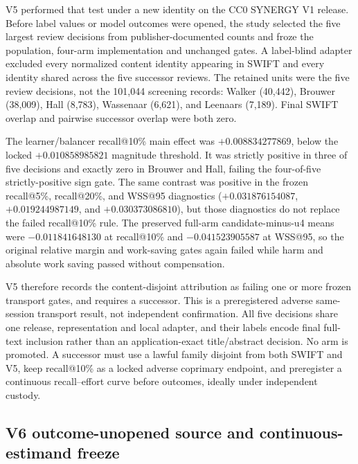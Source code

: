 V5 performed that test under a new identity on the CC0 SYNERGY V1 release.
Before label values or model outcomes were opened, the study selected the five
largest review decisions from publisher-documented counts and froze the
population, four-arm implementation and unchanged gates.  A label-blind
adapter excluded every normalized content identity appearing in SWIFT and
every identity shared across the five successor reviews.  The retained units
were the five review decisions, not the 101,044 screening records: Walker
(40,442), Brouwer (38,009), Hall (8,783), Wassenaar (6,621), and Leenaars
(7,189).  Final SWIFT overlap and pairwise successor overlap were both zero.

The learner/balancer recall@10\% main effect was $+0.008834277869$, below the
locked $+0.010858985821$ magnitude threshold.  It was strictly positive in
three of five decisions and exactly zero in Brouwer and Hall, failing the
four-of-five strictly-positive sign gate.  The same contrast was positive in
the frozen recall@5\%, recall@20\%, and WSS@95 diagnostics
($+0.031876154087$, $+0.019244987149$, and $+0.030373086810$), but those
diagnostics do not replace the failed recall@10\% rule.  The preserved full-arm
candidate-minus-u4 means were $-0.011841648130$ at recall@10\% and
$-0.041523905587$ at WSS@95, so the original relative margin and work-saving
gates again failed while harm and absolute work saving passed without
compensation.

V5 therefore records the content-disjoint attribution as failing one or more frozen transport gates, and requires a successor.
This is a preregistered adverse same-session transport result, not independent
confirmation.  All five decisions share one release, representation and local
adapter, and their labels encode final full-text inclusion rather than an
application-exact title/abstract decision.  No arm is promoted.  A successor
must use a lawful family disjoint from both SWIFT and V5, keep recall@10\% as a
locked adverse coprimary endpoint, and preregister a continuous recall--effort
curve before outcomes, ideally under independent custody.

\subsection{V6 outcome-unopened source and continuous-estimand freeze}

